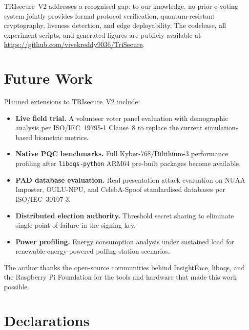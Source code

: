 \documentclass[pdflatex,sn-mathphys-num]{sn-jnl}%
\theoremstyle{thmstyleone}%
\theoremstyle{thmstyletwo}%
\theoremstyle{thmstylethree}%
\begin{document}
TRIsecure~V2 addresses a recognised gap: to our knowledge, no prior e-voting
system jointly provides formal protocol verification, quantum-resistant
cryptography, liveness detection, and edge deployability. The codebase, all
experiment scripts, and generated figures are publicly available at
\url{https://github.com/vivekreddy9036/TriSecure}.

\section{Future Work}\label{sec:future}

Planned extensions to TRIsecure~V2 include:
\begin{itemize}
  \item \textbf{Live field trial.} A volunteer voter panel evaluation with
    demographic analysis per ISO/IEC~19795-1 Clause~8 to replace the current
    simulation-based biometric metrics.
  \item \textbf{Native PQC benchmarks.} Full Kyber-768/Dilithium-3 performance
    profiling after \texttt{liboqs-python} ARM64 pre-built packages become
    available.
  \item \textbf{PAD database evaluation.} Real presentation attack evaluation on
    NUAA Imposter, OULU-NPU, and CelebA-Spoof standardised databases per
    ISO/IEC~30107-3.
  \item \textbf{Distributed election authority.} Threshold secret sharing to
    eliminate single-point-of-failure in the signing key.
  \item \textbf{Power profiling.} Energy consumption analysis under sustained
    load for renewable-energy-powered polling station scenarios.
\end{itemize}

\backmatter


The author thanks the open-source communities behind InsightFace, liboqs, and
the Raspberry Pi Foundation for the tools and hardware that made this work
possible.

\section*{Declarations}
\end{document}
